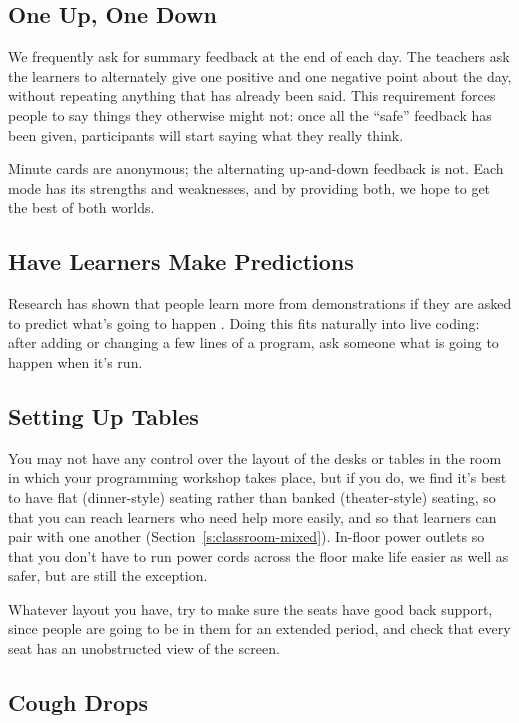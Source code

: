 \subsection*{One Up, One Down}

We frequently ask for summary feedback at the end of each day. The
teachers ask the learners to alternately give one positive and one
negative point about the day, without repeating anything that has
already been said. This requirement forces people to say things they
otherwise might not: once all the ``safe'' feedback has been given,
participants will start saying what they really think.

Minute cards are anonymous; the alternating up-and-down feedback is not.
Each mode has its strengths and weaknesses, and by providing both, we
hope to get the best of both worlds.

\subsection*{Have Learners Make Predictions}

Research has shown that people learn more from demonstrations if they
are asked to predict what's going to happen \cite{Mill2013}. Doing
this fits naturally into live coding: after adding or changing a few
lines of a program, ask someone what is going to happen when it's run.

\subsection*{Setting Up Tables}

You may not have any control over the layout of the desks or tables in
the room in which your programming workshop takes place, but if you do,
we find it's best to have flat (dinner-style) seating rather than banked
(theater-style) seating, so that you can reach learners who need help
more easily, and so that learners can pair with one another
(Section~\ref{s:classroom-mixed}). In-floor power outlets so that you
don't have to run power cords across the floor make life easier as
well as safer, but are still the exception.

Whatever layout you have, try to make sure the seats have good back
support, since people are going to be in them for an extended period,
and check that every seat has an unobstructed view of the screen.

\subsection*{Cough Drops}

